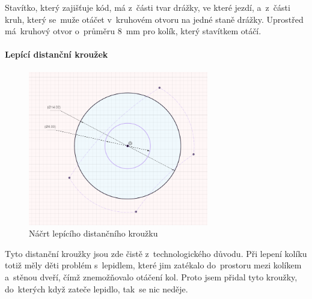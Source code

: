 Stavítko, který zajišťuje kód, má z~části tvar drážky, ve které jezdí, a~z~části kruh, který se~muže otáčet v~kruhovém otvoru na jedné staně drážky.
Uprostřed má~kruhový otvor o~průměru 8~mm pro kolík, který stavítkem otáčí.

\paragraph{Lepící distanční kroužek}

\begin{figure}[h]
	\centering
    \includegraphics[width=0.7\textwidth]{kapitoly/obrazky/M3/lepici_distance.png}
    \caption{Náčrt lepícího distančního kroužku}
    \label{fig:M3-lepici-distance}
\end{figure}

Tyto distanční kroužky jsou zde čistě z~technologického důvodu. Při lepení kolíku totiž měly děti problém s~lepidlem, které jim zatékalo do~prostoru mezi kolíkem 
a~stěnou dveří, čímž znemožňovalo otáčení kol. Proto jsem přidal tyto kroužky, do~kterých když zateče lepidlo, tak~se nic neděje.

\newpage
